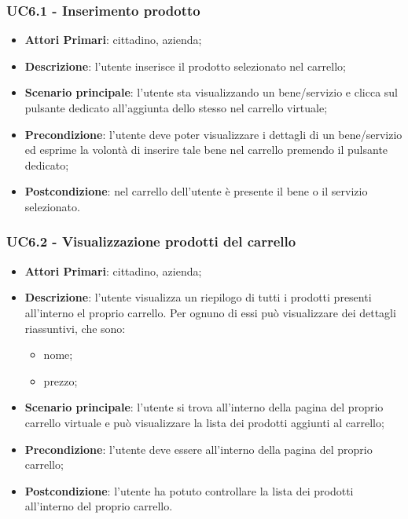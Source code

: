  \subsubsection{UC6.1 - Inserimento prodotto}
\begin{itemize}
	\item \textbf{Attori Primari}: cittadino, azienda\glo;
	\item \textbf{Descrizione}: l'utente inserisce il prodotto selezionato nel carrello;
	\item \textbf{Scenario principale}: l'utente sta visualizzando un bene/servizio e clicca sul pulsante dedicato all'aggiunta dello stesso nel carrello virtuale;
	\item \textbf{Precondizione}: l'utente deve poter visualizzare i dettagli di un bene/servizio ed esprime la volontà di inserire tale bene nel carrello premendo il pulsante dedicato;
	\item \textbf{Postcondizione}: nel carrello dell'utente è presente il bene o il servizio selezionato.
\end{itemize}
\subsubsection{UC6.2 - Visualizzazione prodotti del carrello}
\begin{itemize}
	\item \textbf{Attori Primari}: cittadino, azienda\glo;
	\item \textbf{Descrizione}: l'utente visualizza un riepilogo di tutti i prodotti presenti all'interno el proprio carrello. Per ognuno di essi può visualizzare dei dettagli riassuntivi, che sono:
	\begin{itemize}
		\item nome;
		\item prezzo; 
	\end{itemize}
	\item \textbf{Scenario principale}: l'utente si trova all'interno della pagina del proprio carrello virtuale e può visualizzare la lista dei prodotti aggiunti al carrello;
	\item \textbf{Precondizione}: l'utente deve essere all'interno della pagina del proprio carrello;
	\item \textbf{Postcondizione}: l'utente ha potuto controllare la lista dei prodotti all'interno del proprio carrello.
\end{itemize}
